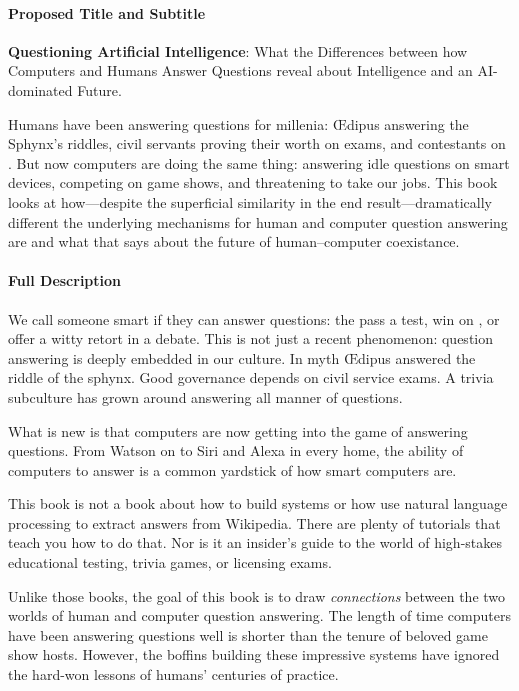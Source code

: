 
\clearpage

\paragraph{Proposed Title and Subtitle} \vspace{3cm}

{\bf Questioning Artificial Intelligence}: What the Differences between how
Computers and Humans Answer Questions reveal about Intelligence and an
AI-dominated Future.

\vspace{3cm}

Humans have been answering questions for millenia: \OE{}dipus answering the
Sphynx's riddles, civil servants proving their worth on exams, and contestants
on \jeopardyp{}.
%
But now computers are doing the same thing: answering idle questions on smart
devices, competing on game shows, and threatening to take our jobs.
%
This book looks at how---despite the superficial similarity in the end
result---dramatically different the underlying mechanisms for human and
computer question answering are and what that says about the future of
human--computer coexistance.

\paragraph{Full Description}

We call someone smart if they can answer questions: the pass a test, win
on \jeopardyp{}, or offer a witty retort in a debate.
%
This is not just a recent phenomenon: question answering is deeply embedded in
our culture.
%
In myth \OE{}dipus answered the riddle of the sphynx.
%
Good governance depends on civil service exams.
%
A trivia subculture has grown around answering all manner of questions.

What is new is that computers are now getting into the game of answering
questions.
%
From  Watson on \jeopardy{} to Siri and Alexa in every home, the ability of
computers to answer is a common yardstick of how smart computers are.

This book is not a book about how to build  systems or how use natural
language processing to extract answers from Wikipedia.
%
There are plenty of tutorials that teach you how to do that.
%
Nor is it an insider's guide to the world of high-stakes educational testing,
trivia games, or licensing exams.

Unlike those books, the goal of this book is to draw \emph{connections}
between the two worlds of human and computer question answering.
%
The length of time computers have been answering questions well is shorter
than the tenure of beloved game show hosts.
%
However, the  boffins building these impressive systems have ignored
the hard-won lessons of humans' centuries of practice.

